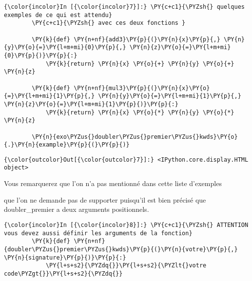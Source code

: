     \begin{Verbatim}[commandchars=\\\{\},frame=single,framerule=0.3mm,rulecolor=\color{cellframecolor}]
{\color{incolor}In [{\color{incolor}7}]:} \PY{c+c1}{\PYZsh{} quelques exemples de ce qui est attendu}
        \PY{c+c1}{\PYZsh{} avec ces deux fonctions }
        
        \PY{k}{def} \PY{n+nf}{add3}\PY{p}{(}\PY{n}{x}\PY{p}{,} \PY{n}{y}\PY{o}{=}\PY{l+m+mi}{0}\PY{p}{,} \PY{n}{z}\PY{o}{=}\PY{l+m+mi}{0}\PY{p}{)}\PY{p}{:}
            \PY{k}{return} \PY{n}{x} \PY{o}{+} \PY{n}{y} \PY{o}{+} \PY{n}{z}
        
        \PY{k}{def} \PY{n+nf}{mul3}\PY{p}{(}\PY{n}{x}\PY{o}{=}\PY{l+m+mi}{1}\PY{p}{,} \PY{n}{y}\PY{o}{=}\PY{l+m+mi}{1}\PY{p}{,} \PY{n}{z}\PY{o}{=}\PY{l+m+mi}{1}\PY{p}{)}\PY{p}{:}
            \PY{k}{return} \PY{n}{x} \PY{o}{*} \PY{n}{y} \PY{o}{*} \PY{n}{z}
        
        \PY{n}{exo\PYZus{}doubler\PYZus{}premier\PYZus{}kwds}\PY{o}{.}\PY{n}{example}\PY{p}{(}\PY{p}{)}
\end{Verbatim}


\begin{Verbatim}[commandchars=\\\{\},frame=single,framerule=0.3mm,rulecolor=\color{cellframecolor}]
{\color{outcolor}Out[{\color{outcolor}7}]:} <IPython.core.display.HTML object>
\end{Verbatim}
            
    Vous remarquerez que l'on n'a pas mentionné dans cette liste d'exemples

\begin{Shaded}
\begin{Highlighting}[frame=lines,framerule=0.6mm,rulecolor=\color{asisframecolor}]
\OperatorTok{=}\OperatorTok{=}\NormalTok{)}
\end{Highlighting}
\end{Shaded}

que l'on ne demande pas de supporter puisqu'il est bien précisé que
doubler\_premier a deux arguments positionnels.

    \begin{Verbatim}[commandchars=\\\{\},frame=single,framerule=0.3mm,rulecolor=\color{cellframecolor}]
{\color{incolor}In [{\color{incolor}8}]:} \PY{c+c1}{\PYZsh{} ATTENTION vous devez aussi définir les arguments de la fonction}
        \PY{k}{def} \PY{n+nf}{doubler\PYZus{}premier\PYZus{}kwds}\PY{p}{(}\PY{n}{votre}\PY{p}{,} \PY{n}{signature}\PY{p}{)}\PY{p}{:}
            \PY{l+s+s2}{\PYZdq{}}\PY{l+s+s2}{\PYZlt{}votre code\PYZgt{}}\PY{l+s+s2}{\PYZdq{}}
\end{Verbatim}


